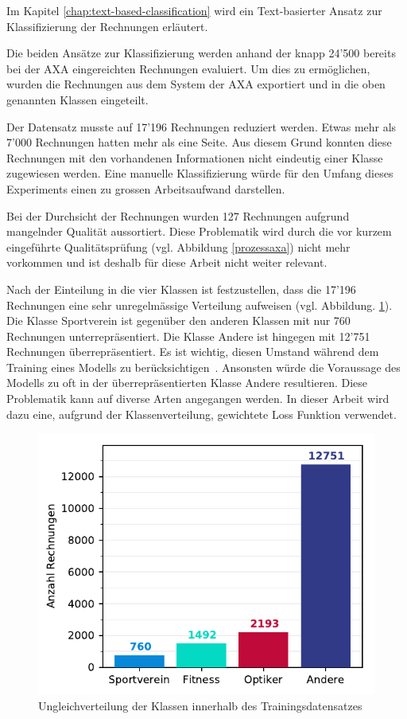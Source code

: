Im Kapitel \ref{chap:text-based-classification} wird ein Text-basierter Ansatz zur Klassifizierung der Rechnungen erläutert.

Die beiden Ansätze zur Klassifizierung werden anhand der knapp 24'500 bereits bei der AXA eingereichten Rechnungen evaluiert. Um dies zu ermöglichen, wurden die Rechnungen aus dem System der AXA exportiert und in die oben genannten Klassen eingeteilt. 

Der Datensatz musste auf 17'196 Rechnungen reduziert werden. Etwas mehr als 7'000 Rechnungen hatten mehr als eine Seite. Aus diesem Grund konnten diese Rechnungen mit den vorhandenen Informationen nicht eindeutig einer Klasse zugewiesen werden. Eine manuelle Klassifizierung würde für den Umfang dieses Experiments einen zu grossen Arbeitsaufwand darstellen.

Bei der Durchsicht der Rechnungen wurden 127 Rechnungen aufgrund mangelnder Qualität aussortiert. Diese Problematik wird durch die vor kurzem eingeführte Qualitätsprüfung (vgl. Abbildung \ref{prozessaxa}) nicht mehr vorkommen und ist deshalb für diese Arbeit nicht weiter relevant.

Nach der Einteilung in die vier Klassen ist festzustellen, dass die 17'196 Rechnungen eine sehr unregelmässige Verteilung aufweisen (vgl. Abbildung. \ref{class-distribution}). Die Klasse Sportverein ist gegenüber den anderen Klassen mit nur 760 Rechnungen unterrepräsentiert. Die Klasse Andere ist hingegen mit 12'751 Rechnungen überrepräsentiert. Es ist wichtig, diesen Umstand während dem Training eines Modells zu berücksichtigen~\autocite{Buda2018}. Ansonsten würde die Voraussage des Modells zu oft in der überrepräsentierten Klasse Andere resultieren. Diese Problematik kann auf diverse Arten angegangen werden. In dieser Arbeit wird dazu eine, aufgrund der Klassenverteilung, gewichtete Loss Funktion verwendet.

\begin{figure}[h]
    \captionsetup{width=.9\linewidth}
    \caption{Ungleichverteilung der Klassen innerhalb des Trainingsdatensatzes}
    \label{class-distribution}
    \centering
    \includegraphics[scale=1]{graphics/matplot/class-weight.pdf}
\end{figure}
